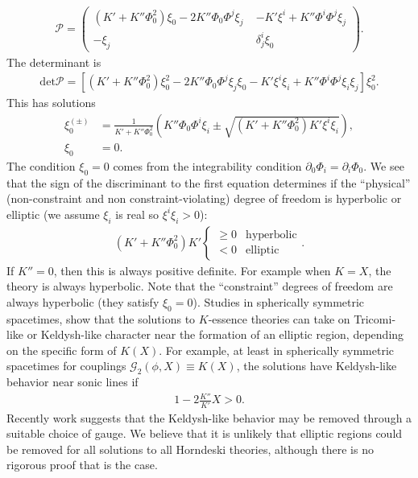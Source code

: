 \documentclass{ws-ijmpd}
\begin{document}
\begin{align}
   \mathcal{P}
   =
   \begin{pmatrix}
      \left(
         K' 
         +
         K'' \Phi_0^2
      \right)
      \xi_0
      -
      2K'' \Phi_0\Phi^j\xi_j
      \;
      & 
      -
      K'\xi^i
      +
      K'' \Phi^i\Phi^j\xi_j
      \\
      -
      \xi_j
      &
      \delta^i_j\xi_0
   \end{pmatrix}
   .
\end{align}
The determinant is
\begin{align}
   \mathrm{det}\mathcal{P}
   =
   \left[
      \left(
         K' 
         +
         K'' \Phi_0^2
      \right)
      \xi_0^2
      -
      2K'' \Phi_0\Phi^j\xi_j \xi_0
      -
      K'\xi^i\xi_i
      +
      K'' \Phi^i\Phi^j\xi_i\xi_j
   \right]
   \xi_0^2
   .
\end{align}
This has solutions
\begin{align}
   \xi^{(\pm)}_0
   &=
   \frac{1}{K' + K''\Phi_0^2}
   \left(
      K'' \Phi_0\Phi^i\xi_i
      \pm
      \sqrt{
         \left(K' + K''\Phi_0^2\right)
         K'\xi^i\xi_i
      }
   \right)
   ,\\
   \xi_0
   &=
   0
   .
\end{align}
The condition $\xi_0=0$ comes from the integrability condition
$\partial_0\Phi_i=\partial_i\Phi_0$.
We see that the sign of the discriminant to the first equation
determines if the ``physical'' 
(non-constraint and non constraint-violating)
degree of freedom is hyperbolic or elliptic
(we assume $\xi_i$ is real so $\xi^i\xi_i>0$):
\begin{align}
\label{eq:discriminant_k_essence}
   \left(K' + K''\Phi_0^2\right)
   K'
   \begin{cases}
      \geq
      0
      & 
      \mathrm{hyperbolic}
      \\
      <
      0
      &
      \mathrm{elliptic}
   \end{cases}
   .
\end{align}
If $K''=0$, then this is always positive definite. For example
when $K=X$, the theory is always hyperbolic.
Note that the ``constraint'' degrees of freedom are always
hyperbolic (they satisfy $\xi_0=0$).
Studies in spherically symmetric spacetimes,
show that the solutions to $K$-essence theories can take on
Tricomi-like or Keldysh-like character near the formation of
an elliptic region, depending on the specific form of 
$K(X)$\cite{Bernard:2019fjb,Bezares:2020wkn,Lara:2021piy}.
For example, at least in spherically symmetric spacetimes
for couplings $\mathcal{G}_2\left(\phi,X\right)\equiv K\left(X\right)$,
the solutions have Keldysh-like behavior
near sonic lines if\cite{Bezares:2020wkn}
\begin{align}
   1 - 2\frac{K''}{K'}X > 0
   .
\end{align}
Recently work suggests that the
Keldysh-like behavior may be removed through a suitable choice
of gauge\cite{Bezares:2021dma}.
We believe that it is unlikely that elliptic regions 
could be removed for all solutions to all Horndeski theories, 
although there is no rigorous proof that is the case.
\end{document}
